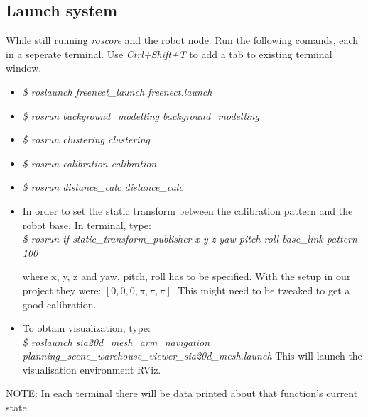 \documentclass[10pt,a4paper]{article}
\begin{document}
\subsection{Launch system}
While still running \textit{roscore} and the robot node. Run the following comands, each in a seperate terminal.
Use \textit{Ctrl+Shift+T} to add a tab to existing terminal window.
\begin{itemize}
\item \textit{\$ roslaunch freenect\_launch freenect.launch}

\item \textit{\$ rosrun background\_modelling background\_modelling}

\item \textit{\$ rosrun clustering clustering}

\item \textit{\$ rosrun calibration calibration}

\item \textit{\$ rosrun distance\_calc distance\_calc}

\item In order to set the static transform between the calibration pattern and the robot base. In terminal, type:\\
 \textit{\$ rosrun tf static\_transform\_publisher x y z yaw pitch roll base\_link pattern 100}
 
where x, y, z and yaw, pitch, roll has to be specified. With the setup in our project they were: $\left[0, 0, 0, \pi, \pi, \pi \right].$ This might need to be tweaked to get a good calibration.

\item To obtain visualization, type:\\
\textit{\$ roslaunch sia20d\_mesh\_arm\_navigation planning\_scene\_warehouse\_viewer\_sia20d\_mesh.launch}
This will launch the visualisation environment RViz.

\end{itemize}
NOTE: In each terminal there will be data printed about that function's current state.
\end{document}
